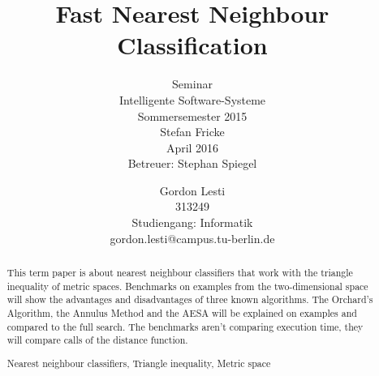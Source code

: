 \documentclass[runningheads,a4paper]{llncs}
\newcommand{\keywords}[1]{\par\addvspace\baselineskip
\noindent\keywordname\enspace\ignorespaces#1}
\begin{document}
\mainmatter

\title{Fast Nearest Neighbour Classification}
\subtitle{\textnormal{\small{Seminar\\
Intelligente Software-Systeme\\
Sommersemester 2015\\\vspace{1\baselineskip}
Stefan Fricke\\\vspace{2\baselineskip}
April 2016\\
Betreuer: Stephan Spiegel\\\vspace{1\baselineskip}}}}


\author{Gordon Lesti\\313249\\Studiengang: Informatik\\gordon.lesti@campus.tu-berlin.de\\\vspace{5\baselineskip}}



\maketitle


\begin{abstract}
This term paper is about nearest neighbour classifiers that work with the triangle inequality of metric spaces.
Benchmarks on examples from the two-dimensional space will show the advantages and disadvantages of three known
algorithms. The Orchard’s Algorithm, the Annulus Method and the AESA will be explained on examples and compared to the
full search. The benchmarks aren't comparing execution time, they will compare calls of the distance function.
\keywords{Nearest neighbour classifiers, Triangle inequality, Metric space}
\end{abstract}
\end{document}
